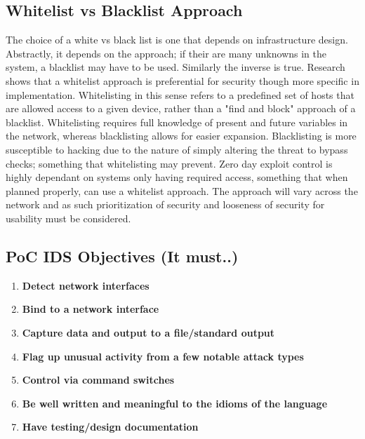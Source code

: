 \subsection{Whitelist vs Blacklist Approach}
The choice of a white vs black list is one that depends on infrastructure design. Abstractly, it depends on the approach; if their are many unknowns in the system, a blacklist may have to be used. 
Similarly the inverse is true. Research shows that a whitelist approach is preferential for security though more specific in implementation. Whitelisting in this sense refers to a predefined set of hosts
that are allowed access to a given device, rather than a "find and block" approach of a blacklist. Whitelisting requires full knowledge of present and future variables in the network, whereas blacklisting
allows for easier expansion. Blacklisting is more susceptible to hacking due to the nature of simply altering the threat to bypass checks; something that whitelisting may prevent. Zero day exploit control is 
highly dependant on systems only having required access, something that when planned properly, can use a whitelist approach. The approach will vary across the network and as such prioritization of security 
and looseness of security for usability must be considered.


\subsection{PoC IDS Objectives (It must..)}
\begin{enumerate}
	\item \textbf{Detect network interfaces}
	\item \textbf{Bind to a network interface}
	\item \textbf{Capture data and output to a file/standard output}
	\item \textbf{Flag up unusual activity from a few notable attack types}
	\item \textbf{Control via command switches}
	\item \textbf{Be well written and meaningful to the idioms of the language}
	\item \textbf{Have testing/design documentation}
\end{enumerate}


